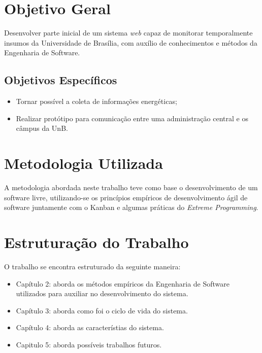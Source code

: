 \section{Objetivo Geral}
Desenvolver parte inicial de um sistema \textit{web} capaz de monitorar temporalmente insumos da Universidade de Brasília, com auxílio de conhecimentos e métodos da Engenharia de Software.

\subsection{Objetivos Específicos}

\begin{itemize}
    \item Tornar possível a coleta de informações energéticas;
    \item Realizar protótipo para comunicação entre uma administração central e os câmpus da UnB.
\end{itemize}

\section{Metodologia Utilizada}
A metodologia abordada neste trabalho teve como base o desenvolvimento de um software livre, utilizando-se os princípios empíricos de desenvolvimento ágil de software juntamente com o Kanban e algumas práticas do \textit{Extreme Programming}.

\section{Estruturação do Trabalho}
O trabalho se encontra estruturado da seguinte maneira:

\begin{itemize}
    \item Capítulo 2: aborda os métodos empíricos da Engenharia de Software utilizados para
    auxiliar no desenvolvimento do sistema.
    \item Capítulo 3: aborda como foi o ciclo de vida do sistema.
    \item Capítulo 4: aborda as característias do sistema.
    \item Capitulo 5: aborda possíveis trabalhos futuros.
\end{itemize}